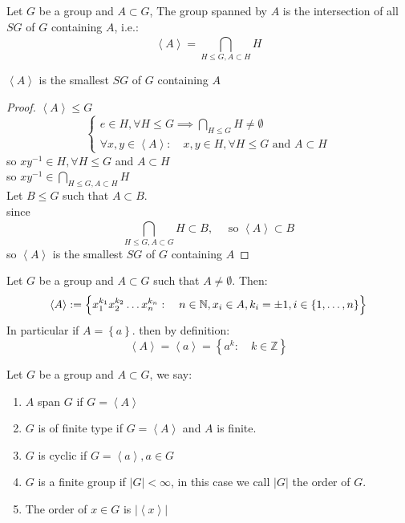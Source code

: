 
\begin{definition}[]
Let $G $ be a group and $A \subset G $, The group spanned by $A $ is the intersection of all 
$SG $ of $G $ containing $A $, i.e.: 
\[
\left\langle A \right\rangle  = 
\bigcap_{H \leq G, A \subset H}^{}  H
\]
\end{definition}
\begin{proposition}[]
$\left\langle A \right\rangle  $ is the smallest $SG $ of $G $ containing $A $ 
\end{proposition}
\begin{proof}
$ \left\langle A \right\rangle \leq G $ 
\[
\begin{cases}
e \in  H, \forall H \leq G \implies 
\bigcap_{H \leq G}^{} H \neq \emptyset  \\
\forall x,y \in  \left\langle A \right\rangle:  \quad 
x,y \in H, \forall H \leq G \text{ and } A \subset H
\end{cases}
\]
so $xy^{-1} \in H, \forall H \leq G $ and $A \subset H $ \\
so $xy^{-1}\in \bigcap_{H \leq G, A \subset H}^{}  H$ \\
Let $B \leq G $ such that $A \subset B$. \\
since 
\[
\bigcap_{H \leq G, A \subset G}^{} H \subset B, \quad 
\text{ so } \left\langle A \right\rangle  \subset B
\]
so $\left\langle A \right\rangle  $ is the smallest $SG$ of $G $ containing $A$   
\end{proof}
\begin{proposition}[]
Let $G $ be a group and $A \subset G $ such that $A \neq \emptyset  $. Then: 
\[
\left\langle A \right\rangle  := 
\left\{ 
  x_1^{k_1} x_2^{k_2} \hdots x_n ^{k_n }: \quad 
  n \in  \mathbb{N}, x_{i} \in A, k_{i} = \pm 1, i \in 
  \left\{ 
    1, \hdots , n
  \right\}
\right\}
\]
In particular if $A = \left\{ a \right\} $. then by definition: 
\[
\left\langle A \right\rangle  = 
\left\langle a \right\rangle  = 
\left\{ a ^{k}: \quad k \in  \mathbb{Z} \right\}
\]
\end{proposition}
\begin{definition}[]
Let $G $ be a group and $A \subset G $, we say:
\begin{enumerate}
\item $A $ span $G $ if $G = \left\langle A \right\rangle  $ 
  \item $G $ is of finite type if $G = \left\langle A \right\rangle  $   and 
    $A $ is finite.
    \item $G $ is cyclic if $G = \left\langle a \right\rangle , a \in G$  
      \item $G $ is a finite group if $\left| G \right|<  \infty  $, in this case we call  
        $\left| G \right| $ the order of $G $. 
        \item The order of $x \in G $ is $\left| \left\langle x \right\rangle  \right| $ 
\end{enumerate}
\end{definition}
